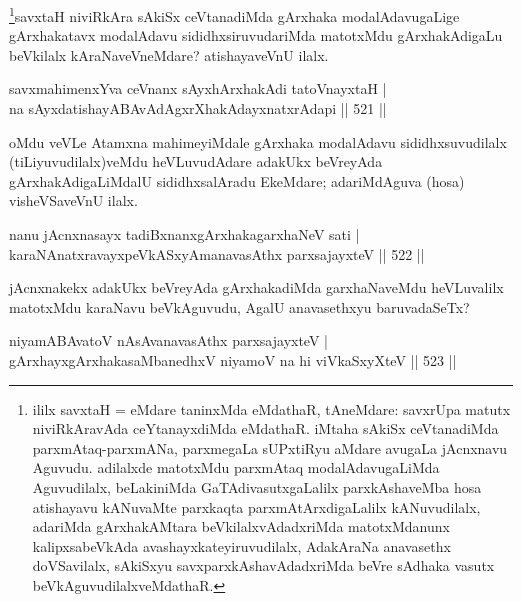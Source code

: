 \begin{artha}
\footnote{ililx savxtaH =  eMdare taninxMda eMdathaR, tAneMdare: savxrUpa matutx niviRkAravAda ceYtanayxdiMda eMdathaR. iMtaha sAkiSx ceVtanadiMda parxmAtaq-parxmANa, parxmegaLa sUPxtiRyu aMdare avugaLa jAcnxnavu Aguvudu. adilalxde matotxMdu parxmAtaq modalAdavugaLiMda Aguvudilalx, beLakiniMda GaTAdivasutxgaLalilx parxkAshaveMba hosa atishayavu kANuvaMte parxkaqta parxmAtArxdigaLalilx kANuvudilalx, adariMda gArxhakAMtara beVkilalxvAdadxriMda matotxMdanunx kalipxsabeVkAda avashayxkateyiruvudilalx, AdakAraNa anavasethx doVSavilalx, sAkiSxyu savxparxkAshavAdadxriMda beVre sAdhaka vasutx beVkAguvudilalxveMdathaR.}savxtaH niviRkAra sAkiSx ceVtanadiMda gArxhaka modalAdavugaLige gArxhakatavx modalAdavu sididhxsiruvudariMda matotxMdu gArxhakAdigaLu beVkilalx kAraNaveVneMdare? atishayaveVnU ilalx.
\end{artha}

\begin{shl}
savxmahimenxYva ceVnanx sAyxhArxhakAdi tatoV\s nayxtaH | \\
na sAyxdatishayABAvAdAgxrXhakAdayxnatxrAdapi \hfill||  521 ||  
\end{shl}

\begin{artha}
oMdu veVLe Atamxna mahimeyiMdale gArxhaka modalAdavu sididhxsuvudilalx (tiLiyuvudilalx)veMdu  heVLuvudAdare adakUkx beVreyAda gArxhakAdigaLiMdalU sididhxsalAradu EkeMdare; adariMdAguva (hosa) visheVSaveVnU ilalx.
\end{artha}


\begin{shl}
nanu jAcnxnasayx tadiBxnanxgArxhakagarxhaNeV sati | \\
karaNAnatxravayxpeVkASxyAmanavasAthx parxsajayxteV \hfill||  522 ||  
\end{shl}

\begin{artha}
jAcnxnakekx adakUkx beVreyAda gArxhakadiMda garxhaNaveMdu heVLuvalilx matotxMdu karaNavu beVkAguvudu, AgalU anavasethxyu baruvadaSeTx?
\end{artha}


\begin{shl}
niyamABAvatoV nAsAvanavasAthx parxsajayxteV | \\
gArxhayxgArxhakasaMbanedhxV niyamoV na hi viVkaSxyXteV \hfill||  523 ||  
\end{shl}

